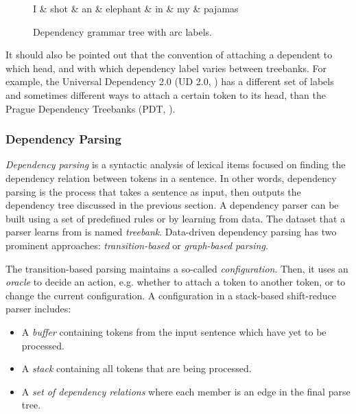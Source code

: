 \begin{figure}[t]
    \centering
    \begin{dependency}
        \begin{deptext}
        I \& shot \& an \& elephant \& in \& my \& pajamas \\
        \end{deptext}
    \end{dependency}
    \caption{Dependency grammar tree with arc labels.}
    \label{fig:dependency_tree_label}
\end{figure}

It should also be pointed out that the convention of attaching a dependent to which head, and with which dependency label varies between treebanks. For example, the Universal Dependency 2.0 (UD 2.0, \cite{UD20}) has a different set of labels and sometimes different ways to attach a certain token to its head, than the Prague Dependency Treebanks (PDT, \cite{pdt20:2006}).

\subsubsection{Dependency Parsing}
\label{the-ling-dep-parse}
\textit{Dependency parsing} is a syntactic analysis of lexical items focused on finding the dependency relation between tokens in a sentence.
In other words, dependency parsing is the process that takes a sentence as input, then outputs the dependency tree discussed in the previous section.
A dependency parser can be built using a set of predefined rules or by learning from data.
The dataset that a parser learns from is named \textit{treebank}.
Data-driven dependency parsing has two prominent approaches: \textit{transition-based} or \textit{graph-based parsing}.

The transition-based parsing maintains a so-called \textit{configuration}. Then, it uses an \textit{oracle} to decide an action, e.g. whether to attach a token to another token, or to change the current configuration. A configuration in a stack-based shift-reduce parser includes:

\begin{itemize}
    \item A \textit{buffer} containing tokens from the input sentence which have yet to be processed.
    \item A \textit{stack} containing all tokens that are being processed.
    \item A \textit{set of dependency relations} where each member is an edge in the final parse tree.
\end{itemize}

